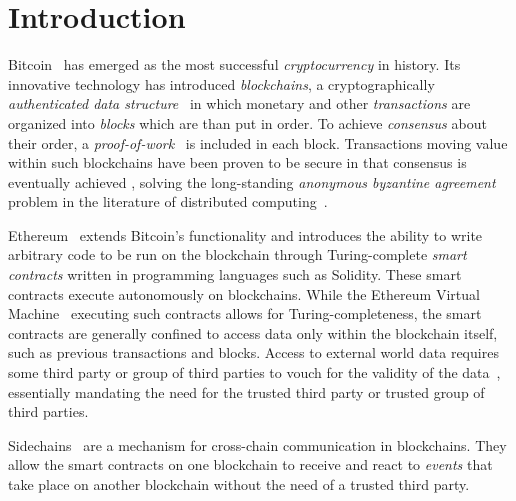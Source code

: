 \section{Introduction}

Bitcoin~\cite{bitcoin} has emerged as the most successful \emph{cryptocurrency}
in history. Its innovative technology has introduced \emph{blockchains}, a
cryptographically \emph{authenticated data
structure}~\cite{miller2014authenticated} in which monetary and other
\emph{transactions} are organized into \emph{blocks} which are than put in
order. To achieve \emph{consensus} about their order, a
\emph{proof-of-work}~\cite{C:DwoNao92} is included in each block. Transactions
moving value within such blockchains have been proven to be secure in that
consensus is eventually achieved \cite{EC:GarKiaLeo15}\cite{C:GarKiaLeo17},
solving the long-standing \emph{anonymous byzantine agreement} problem in the
literature of distributed computing~\cite{miller2014anonymous}.

Ethereum~\cite{buterin} extends Bitcoin's functionality and introduces the
ability to write arbitrary code to be run on the blockchain through
Turing-complete \emph{smart contracts} written in programming languages such as
Solidity. These smart contracts execute autonomously on blockchains.
While the Ethereum Virtual Machine~\cite{wood} executing such contracts allows
for Turing-completeness, the smart contracts are generally confined to access
data only within the blockchain itself, such as previous transactions and
blocks. Access to external world data requires some third party or group of
third parties to vouch for the validity of the data~\cite{CCS:ZCCJS16},
essentially mandating the need for the trusted third party or trusted group of
third parties.

Sidechains~\cite{sidechains} are a mechanism for cross-chain communication in
blockchains. They allow the smart contracts on one blockchain to receive and
react to \textit{events} that take place on another blockchain without the need
of a trusted third party.

